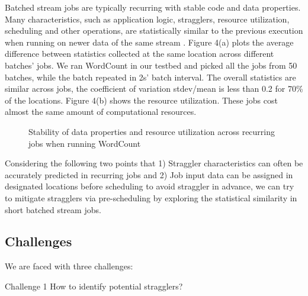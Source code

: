 \documentclass[10pt,conference,compsocconf,letterpaper]{IEEEtran}
\begin{document}
  Batched stream jobs are typically recurring with stable code and data properties.  Many characteristics, such as application logic, stragglers, resource utilization, scheduling and other operations, are statistically similar to the previous execution when running on newer data of the same stream \cite{Agarwal}. Figure 4(a) plots the average difference between statistics collected at the same location across different batches' jobs. We ran WordCount in our testbed and picked all the jobs from 50 batches, while the batch repeated in 2s' batch interval. The overall statistics are similar across jobs, the coefficient of variation stdev/mean is less than 0.2 for 70\% of the locations. Figure 4(b) shows the resource utilization. These jobs cost almost the same amount of computational resources.
  \begin{figure}[htbp]
    \centering
    \caption{Stability of data properties and resource utilization across recurring jobs when running WordCount}
    \label{Fig. 4:}
  \end{figure}

  Considering the following two points that 1) Straggler characteristics can often be accurately predicted in recurring jobs and 2) Job input data can be assigned in designated locations before scheduling to avoid straggler in advance, we can try to mitigate stragglers via pre-scheduling by exploring the statistical similarity in short batched stream jobs.

\subsection{Challenges}

  We are faced with three challenges:

  Challenge 1 How to identify potential stragglers?
\end{document}
